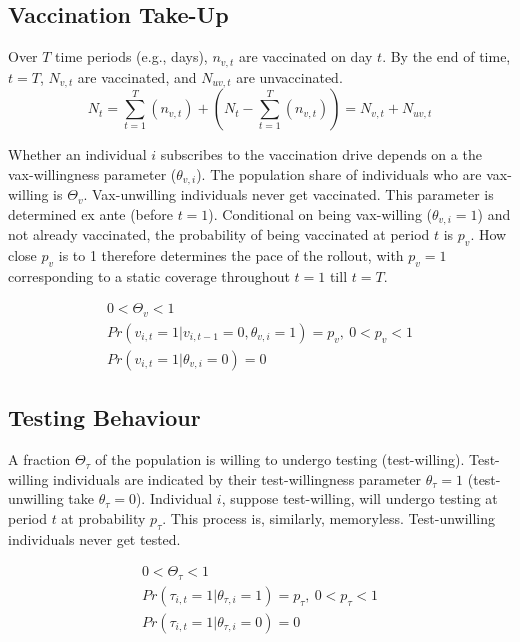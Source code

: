 \documentclass[12pt]{article}
\begin{document}
\subsection{Vaccination Take-Up}
Over $T$ time periods (e.g., days), $n_{v, t}$ are vaccinated on day $t$. By the end of time, $t = T$, $N_{v, t}$ are vaccinated, and $N_{uv, t}$ are unvaccinated.
\begin{equation}
	N_{t} = \sum_{t=1}^{T} (n_{v, t}) + (N_{t} - \sum_{t=1}^{T} (n_{v, t})) = N_{v, t} + N_{uv, t}
\end{equation}

Whether an individual $i$ subscribes to the vaccination drive depends on a the vax-willingness parameter ($\theta_{v, i}$). The population share of individuals who are vax-willing is $\Theta_{v}$. Vax-unwilling individuals never get vaccinated. This parameter is determined ex ante (before $t = 1$). Conditional on being vax-willing ($\theta_{v, i} = 1$) and not already vaccinated, the probability of being vaccinated at period $t$ is $p_v$. How close $p_v$ is to 1 therefore determines the pace of the rollout, with $p_v = 1$ corresponding to a static coverage throughout $t = 1$ till $t = T$.

\begin{eqnarray}
	0 < \Theta_{v} < 1 \\
	Pr(v_{i,t}=1 | v_{i,t-1}=0, \theta_{v,i} = 1) = p_v, \  0 < p_v < 1 \\ 
	Pr(v_{i,t}=1 | \theta_{v,i} = 0) = 0
\end{eqnarray}

\subsection{Testing Behaviour}
A fraction $\Theta_{\tau}$ of the population is willing to undergo testing (test-willing). Test-willing individuals are indicated by their test-willingness parameter $\theta_{\tau} = 1$ (test-unwilling take $\theta_{\tau} = 0$). Individual $i$, suppose test-willing, will undergo testing at period $t$ at probability $p_{\tau}$. This process is, similarly, memoryless. Test-unwilling individuals never get tested. 

\begin{eqnarray}
	0 < \Theta_{\tau} < 1 \\
	Pr({\tau}_{i,t}=1 | \theta_{\tau,i} = 1) = p_{\tau}, \  0 < p_{\tau} < 1 \\ 
	Pr({\tau}_{i,t}=1 | \theta_{\tau,i} = 0) = 0
\end{eqnarray}
\end{document}
